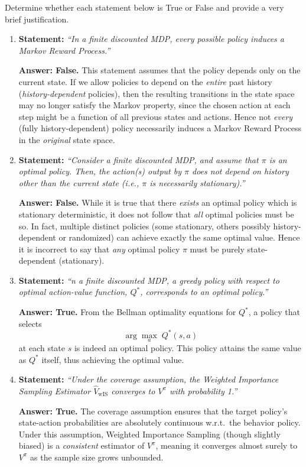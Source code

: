 Determine whether each statement below is True or False and provide a very brief justification.

\begin{enumerate}
    \item \textbf{Statement:} 
    \emph{``In a finite discounted MDP, every possible policy induces a Markov Reward Process.''}

    \textbf{Answer: False.} 
    This statement assumes that the policy depends only on the current state. 
    If we allow policies to depend on the \emph{entire} past history 
    (\emph{history-dependent} policies), 
    then the resulting transitions in the state space may no longer satisfy the Markov property,
    since the chosen action at each step might be a function of all previous states and actions. 
    Hence not \emph{every} (fully history-dependent) policy necessarily induces a Markov Reward Process 
    in the \emph{original} state space.

  \item \textbf{Statement:}
    \emph{``Consider a finite discounted MDP, and assume that $\pi$ is an optimal policy. Then,
    the action(s) output by $\pi$ does not depend on history other than the current state
    (i.e., $\pi$ is necessarily stationary).''}

    \textbf{Answer: False.}
    While it is true that there \emph{exists} an optimal policy which is stationary deterministic, 
    it does not follow that \emph{all} optimal policies must be so. 
    In fact, multiple distinct policies (some stationary, others possibly history-dependent or randomized) 
    can achieve exactly the same optimal value. 
    Hence it is incorrect to say that \emph{any} optimal policy $\pi$ must be purely state-dependent (stationary).

  \item \textbf{Statement:}
    \emph{``n a finite discounted MDP, a greedy policy with respect to optimal action-value
    function, $Q^\ast$, corresponds to an optimal policy.''}

    \textbf{Answer: True.}
    From the Bellman optimality equations for $Q^\ast$, a policy that selects
    \[
      \arg\max_{a} \; Q^\ast(s,a)
    \]
    at each state $s$ is indeed an optimal policy. This policy attains the same value as $Q^\ast$ itself, thus achieving the optimal value.

  \item \textbf{Statement:}
    \emph{``Under the coverage assumption, the Weighted Importance Sampling Estimator $\widehat{V}_{\mathrm{wIS}}$ converges to $V^\pi$ with probability 1.''}

    \textbf{Answer: True.}
    The coverage assumption ensures that the target policy's state-action probabilities are absolutely continuous w.r.t.\ the behavior policy. Under this assumption, Weighted Importance Sampling (though slightly biased) is a \emph{consistent} estimator of $V^\pi$, meaning it converges almost surely to $V^\pi$ as the sample size grows unbounded.

\end{enumerate}